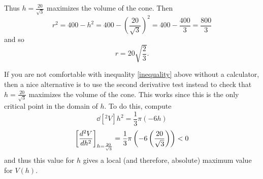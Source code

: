 \documentclass[nooutcomes]{ximera}
\begin{document}
\begin{problem}
\begin{freeResponse}
    Thus $h=\frac{20}{\sqrt{3}}$ maximizes the volume of the cone.
    Then $$r^2 = 400 - h^2 = 400 - \left( \frac{20}{\sqrt{3}} \right)^2 = 400 - \frac{400}{3} = \frac{800}{3}$$ and so $$ r = 20 \sqrt{\frac{2}{3}}. $$
		
    If you are not comfortable with inequality \eqref{inequality} above without a calculator, then a nice alternative is to use the second derivative test instead to check that $h=\frac{20}{\sqrt{3}}$ maximizes the volume of the cone.
    This works since this is the only critical point in the domain of $h$.
    To do this, compute
    $$ \dd[^2V]{h^2} = \frac{1}{3} \pi (-6h) $$
    $$ \eval{\dd[^2V]{h^2}}_{h=\frac{20}{\sqrt{3}}} = \frac{1}{3} \pi \left( -6 \left(\frac{20}{\sqrt{3}} \right) \right) < 0 $$
    and thus this value for $h$ gives a local (and therefore, absolute) maximum value for $V(h)$.  
  \end{freeResponse}
\end{problem}
\end{document}
